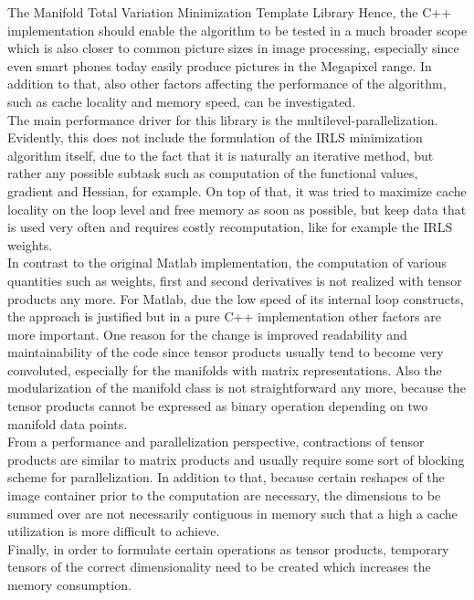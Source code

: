 \begin{chapter}{The Manifold Total Variation Minimization Template Library}
Hence, the C++ implementation should enable the algorithm to be tested in a much broader scope which is
also closer to common picture sizes in image processing, especially since even smart phones today easily produce pictures in the Megapixel range.
In addition to that, also other factors affecting the performance of the algorithm, such as cache locality and memory speed, can be investigated.\\

The main performance driver for this library is the multilevel-parallelization. Evidently, this does not include the formulation of the IRLS minimization algorithm itself, due to the fact that
it is naturally an iterative method, but rather any possible subtask such as computation of the functional values, gradient and Hessian, for example. On top of that, it was tried to
maximize cache locality on the loop level and free memory as soon as possible, but keep data that is used very often and requires costly recomputation, like for example the IRLS weights.\\ 

In contrast to the original Matlab implementation, the computation of various quantities such as weights, first and second derivatives is not realized with tensor products any more.
For Matlab, due the low speed of its internal loop constructs, the approach is justified but in a pure C++ implementation other factors are more important.
One reason for the change is improved readability and maintainability of the code since tensor products usually tend to become very convoluted,
especially for the manifolds with matrix representations. Also the modularization of the manifold class is not straightforward any more, because the tensor products cannot be expressed as binary operation depending on two manifold data points.\\

From a performance and parallelization perspective, contractions of tensor products are similar to matrix products and usually require some sort of blocking scheme for parallelization.
In addition to that, because certain reshapes of the image container prior to the computation are necessary, the dimensions to be summed over are not necessarily contiguous in memory
such that a high a cache utilization is more difficult to achieve.\\
Finally, in order to formulate certain operations as tensor products, temporary tensors of the correct dimensionality need to be created which increases the memory consumption.\\


\end{chapter}
